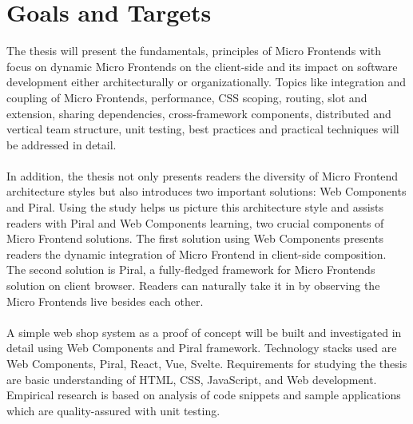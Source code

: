 \documentclass[a4paper]{book}
\begin{document}
\section{Goals and Targets}
The thesis will present the fundamentals,  principles of Micro Frontends with focus on dynamic Micro Frontends on the client-side and its impact on software development either architecturally or organizationally. Topics like integration and coupling of Micro Frontends, performance, CSS scoping, routing, slot and extension, sharing dependencies, cross-framework components, distributed and vertical team structure, unit testing, best practices and practical techniques will be addressed in detail. 
\\
\\
In addition, the thesis not only presents readers the diversity of Micro Frontend architecture styles but also introduces two important solutions: Web Components and Piral. Using the study helps us picture this architecture style and assists readers with Piral and Web Components learning, two crucial components of Micro Frontend solutions. The first solution using Web Components presents readers the dynamic integration of Micro Frontend in client-side composition. The second solution is Piral, a fully-fledged framework for Micro Frontends solution on client browser. Readers can naturally take it in by observing the Micro Frontends live besides each other.
\\
\\
A simple web shop system as a proof of concept will be built and investigated in detail using Web Components and Piral framework. Technology stacks used are Web Components, Piral, React, Vue, Svelte. Requirements for studying the thesis are basic understanding of HTML, CSS, JavaScript, and Web development. Empirical research is based on analysis of code snippets and sample applications which are quality-assured with unit testing.
\end{document}
